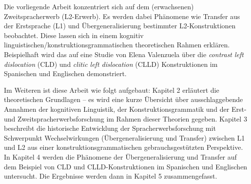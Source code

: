 Die vorliegende Arbeit konzentriert sich auf dem (erwachsenen) Zweitspracherwerb (L2-Erwerb).
Es werden dabei Phänomene wie Transfer aus der Erstsprache (L1) und Übergeneralisierung bestimmter L2-Konstruktionen beobachtet.
Diese lassen sich in einem kognitiv linguistischen/konstruktionsgrammatischen theoretischen Rahmen erklären.
Beispielhaft wird das auf eine Studie von Elena Valenzuela \cite{Valenzuela05} über die \textit{contrast left dislocation} (CLD) und \textit{clitic left dislocation} (CLLD) Konstruktionen im Spanischen und Englischen demonstriert.

Im Weiteren ist diese Arbeit wie folgt aufgebaut:
Kapitel 2 erläutert die theoretischen Grundlagen -- es wird eine kurze Übersicht über ausschlaggebende Annahmen der kognitiven Linguistik, der Konstruktionsgrammatik und der Erst- und Zweitspracherwerbsforschung im Rahmen dieser Theorien gegeben.
Kapitel 3 beschreibt die historische Entwicklung der Spracherwerbsforschung mit Schwerpunkt Wechselwirkungen (Übergeneralisierung und Transfer) zwischen L1 und L2 aus einer konstruktionsgrammatischen gebrauchsgestützten Perspektive.
In Kapitel 4 werden die Phänomene der Übergeneralisierung und Transfer auf dem Beispiel von CLD und CLLD-Konstruktionen im Spanischen und Englischen untersucht.
Die Ergebnisse werden dann in Kapitel 5 zusammengefasst. %
